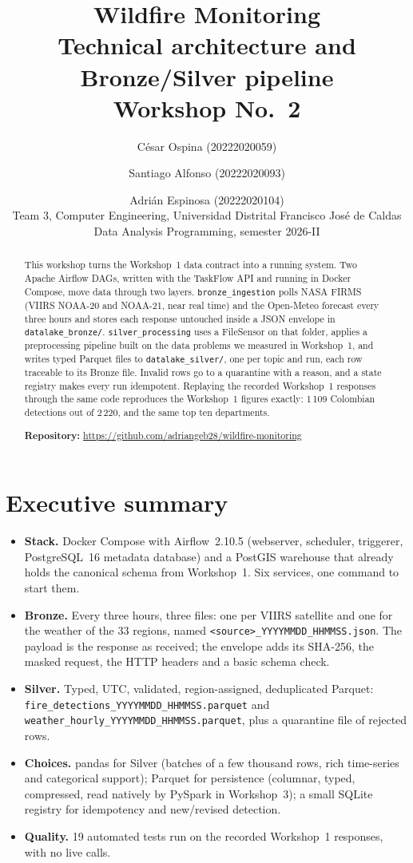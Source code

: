 \documentclass[11pt,a4paper]{article}
\title{\textbf{Wildfire Monitoring}\\[2pt]
\large Technical architecture and Bronze/Silver pipeline\\[10pt]
\normalsize Workshop No.~2}
\author{César Ospina (20222020059) \and Santiago Alfonso (20222020093) \and Adrián Espinosa (20222020104)\\
\normalsize Team 3, Computer Engineering, Universidad Distrital Francisco José de Caldas\\
\normalsize Data Analysis Programming, semester 2026-II}
\date{}
\newcommand{\code}[1]{\texttt{\small #1}}
\begin{document}
\maketitle

\begin{abstract}
\noindent
This workshop turns the Workshop~1 data contract into a running system. Two Apache Airflow DAGs,
written with the TaskFlow API and running in Docker Compose, move data through two layers.
\code{bronze\_ingestion} polls NASA FIRMS (VIIRS NOAA-20 and NOAA-21, near real time) and the
Open-Meteo forecast every three hours and stores each response untouched inside a JSON envelope in
\code{datalake\_bronze/}. \code{silver\_processing} uses a FileSensor on that folder, applies a
preprocessing pipeline built on the data problems we measured in Workshop~1, and writes typed Parquet
files to \code{datalake\_silver/}, one per topic and run, each row traceable to its Bronze file.
Invalid rows go to a quarantine with a reason, and a state registry makes every run idempotent.
Replaying the recorded Workshop~1 responses through the same code reproduces the Workshop~1 figures
exactly: 1\,109 Colombian detections out of 2\,220, and the same top ten departments.

\medskip\noindent\textbf{Repository:} \url{https://github.com/adriangeb28/wildfire-monitoring}
\end{abstract}

\tableofcontents

\section{Executive summary}

\begin{itemize}
  \item \textbf{Stack.} Docker Compose with Airflow~2.10.5 (webserver, scheduler, triggerer,
        PostgreSQL~16 metadata database) and a PostGIS warehouse that already holds the canonical
        schema from Workshop~1. Six services, one command to start them.
  \item \textbf{Bronze.} Every three hours, three files: one per VIIRS satellite and one for the
        weather of the 33 regions, named \code{<source>\_YYYYMMDD\_HHMMSS.json}. The payload is the
        response as received; the envelope adds its SHA-256, the masked request, the HTTP headers and
        a basic schema check.
  \item \textbf{Silver.} Typed, UTC, validated, region-assigned, deduplicated Parquet:
        \code{fire\_detections\_YYYYMMDD\_HHMMSS.parquet} and
        \code{weather\_hourly\_YYYYMMDD\_HHMMSS.parquet}, plus a quarantine file of rejected rows.
  \item \textbf{Choices.} pandas for Silver (batches of a few thousand rows, rich time-series and
        categorical support); Parquet for persistence (columnar, typed, compressed, read natively by
        PySpark in Workshop~3); a small SQLite registry for idempotency and new/revised detection.
  \item \textbf{Quality.} 19 automated tests run on the recorded Workshop~1 responses, with no
        live calls.
\end{itemize}
\end{document}
